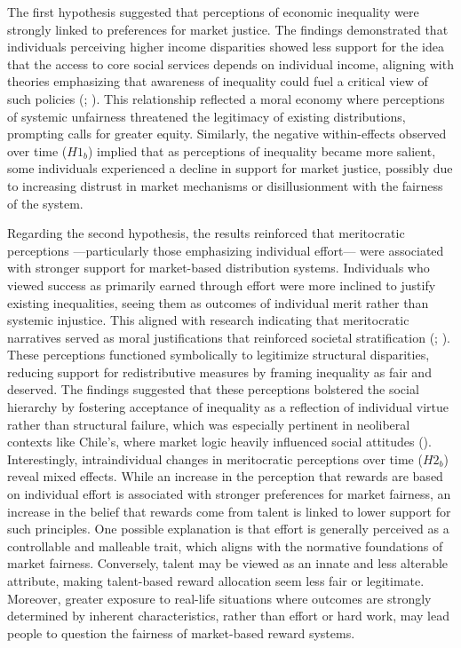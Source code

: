 \documentclass[
  12pt,
]{article}
\begin{document}
The first hypothesis suggested that perceptions of economic inequality
were strongly linked to preferences for market justice. The findings
demonstrated that individuals perceiving higher income disparities
showed less support for the idea that the access to core social services
depends on individual income, aligning with theories emphasizing that
awareness of inequality could fuel a critical view of such policies
(;
). This relationship
reflected a moral economy where perceptions of systemic unfairness
threatened the legitimacy of existing distributions, prompting calls for
greater equity. Similarly, the negative within-effects observed over
time (\(H1_{b}\)) implied that as perceptions of inequality became more
salient, some individuals experienced a decline in support for market
justice, possibly due to increasing distrust in market mechanisms or
disillusionment with the fairness of the system.

Regarding the second hypothesis, the results reinforced that
meritocratic perceptions ---particularly those emphasizing individual
effort--- were associated with stronger support for market-based
distribution systems. Individuals who viewed success as primarily earned
through effort were more inclined to justify existing inequalities,
seeing them as outcomes of individual merit rather than systemic
injustice. This aligned with research indicating that meritocratic
narratives served as moral justifications that reinforced societal
stratification (;
). These perceptions
functioned symbolically to legitimize structural disparities, reducing
support for redistributive measures by framing inequality as fair and
deserved. The findings suggested that these perceptions bolstered the
social hierarchy by fostering acceptance of inequality as a reflection
of individual virtue rather than structural failure, which was
especially pertinent in neoliberal contexts like Chile's, where market
logic heavily influenced social attitudes
().
Interestingly, intraindividual changes in meritocratic perceptions over
time (\(H2_{b}\)) reveal mixed effects. While an increase in the
perception that rewards are based on individual effort is associated
with stronger preferences for market fairness, an increase in the belief
that rewards come from talent is linked to lower support for such
principles. One possible explanation is that effort is generally
perceived as a controllable and malleable trait, which aligns with the
normative foundations of market fairness. Conversely, talent may be
viewed as an innate and less alterable attribute, making talent-based
reward allocation seem less fair or legitimate. Moreover, greater
exposure to real-life situations where outcomes are strongly determined
by inherent characteristics, rather than effort or hard work, may lead
people to question the fairness of market-based reward systems.
\end{document}
